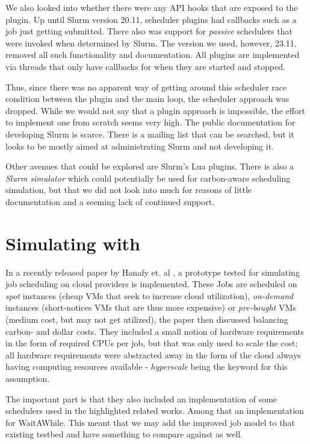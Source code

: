 We also looked into whether there were any API hooks that are exposed to the plugin. 
Up until Slurm version 20.11, scheduler plugins had callbacks such as a job just getting submitted. There also was support for \emph{passive} schedulers that were invoked when determined by Slurm.
The version we used, however,  23.11, removed all such functionality and documentation. All plugins are implemented via threads that only have callbacks for when they are started and stopped.

Thus, since there was no apparent way of getting around this scheduler race condition between the plugin and the main loop, the scheduler approach was dropped. 
While we would not say that a plugin approach is impossible, the effort to implement one from scratch seems very high. 
The public documentation for developing Slurm is scarce. 
There is a mailing list that can be searched, but it looks to be mostly aimed at administrating Slurm and not developing it.

Other avenues that could be explored are Slurm's Lua plugins. 
There is also a \emph{Slurm simulator} which could potentially be used for carbon-aware scheduling simulation, but that we did not look into much for reasons of little documentation and a seeming lack of continued support.

\section{Simulating with \programname{}}

In a recently released paper by Hanafy et. al \cite{hanafy_going_2024}, a prototype tested for simulating job scheduling on cloud providers is implemented. 
These Jobs are scheduled on \emph{spot} instances (cheap VMs that seek to increase cloud utilization), \emph{on-demand} instances (short-notices VMs that are thus more expensive) or \emph{pre-bought} VMs (medium cost, but may not get utilized), the paper then discussed balancing carbon- and dollar costs. 
They included a small notion of hardware requirements in the form of required CPUs per job, but that was only used to scale the cost; all hardware requirements were abstracted away in the form of the cloud always having computing resources available - \emph{hyperscale} being the keyword for this assumption.

The important part is that they also included an implementation of some schedulers used in the highlighted related works. Among that an implementation for WaitAWhile\cite{wiesner_lets_2021}.
This meant that we may add the improved job model to that existing testbed and have something to compare against as well.

